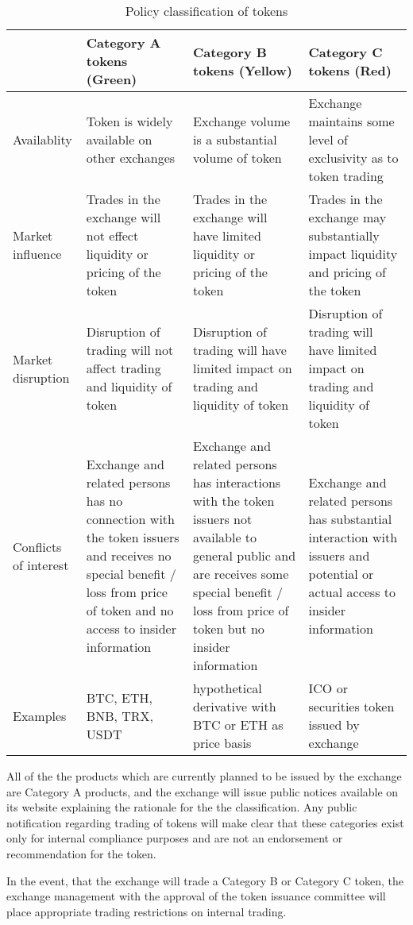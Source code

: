 \begin{table}[htbp]
\centering
\begin{tabularx}{\textwidth}{|X|X|X|X|}
\hline
& \textbf{Category A tokens (Green)} & \textbf{Category B tokens (Yellow)} &
\textbf{Category C tokens (Red)} \\
\hline
Availablity & Token is widely available on other exchanges & Exchange
volume is a substantial volume of token & Exchange maintains some
level of exclusivity as to token trading \\
\hline
Market influence & Trades in the exchange will not effect
liquidity or pricing of the token & Trades in the exchange will
have limited liquidity or pricing of the token & Trades in the
exchange may substantially impact liquidity and pricing of the token \\
\hline
Market disruption & Disruption of trading will not affect trading and
liquidity of token & Disruption of trading will have limited impact on
trading and liquidity of token & Disruption of trading will have
limited impact on trading and liquidity of token  \\
\hline
Conflicts of interest & Exchange and related persons has no connection
with the token issuers and receives no special benefit / loss from price of
token and no access to insider information & Exchange and related persons has interactions with the token
issuers not available to general public and are receives some special
benefit / loss from price of token but no insider information & Exchange and related persons has
substantial interaction with issuers and potential or actual access to
insider information\\
\hline
Examples & BTC, ETH, BNB, TRX, USDT & hypothetical derivative with BTC
or ETH as price basis & ICO or securities token issued by exchange \\
\hline
\end{tabularx}
\caption{Policy classification of tokens}
\end{table}

All of the the products which are currently planned to be issued by
the exchange are Category A products, and the exchange will issue
public notices available on its website explaining the rationale for
the the classification.  Any public notification regarding trading of
tokens will make clear that these categories exist only for internal
compliance purposes and are not an endorsement or recommendation for
the token.

In the event, that the exchange will trade a Category B or Category C
token, the exchange management with the approval of the token issuance
committee will place appropriate trading restrictions on internal
trading.


